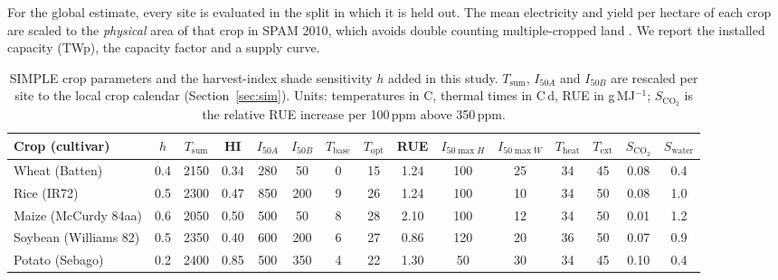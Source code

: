 For the global estimate, every site is evaluated in the split in which it is held out. The mean electricity and yield per hectare of each crop are scaled to the \emph{physical} area of that crop in SPAM 2010, which avoids double counting multiple-cropped land \citep{waha2020}. We report the installed capacity (TWp), the capacity factor and a supply curve.

\begin{table}[t]
\centering
\caption{SIMPLE crop parameters \citep[Table 1a]{zhao2019} and the harvest-index shade sensitivity $h$ added in this study. $T_{\mathrm{sum}}$, $I_{50A}$ and $I_{50B}$ are rescaled per site to the local crop calendar (Section~\ref{sec:sim}). Units: temperatures in \textdegree C, thermal times in \textdegree C\,d, RUE in g\,MJ$^{-1}$; $S_{\mathrm{CO_2}}$ is the relative RUE increase per 100\,ppm above 350\,ppm.}
\label{tab:params}
\scriptsize
\setlength{\tabcolsep}{3pt}
\begin{tabular}{lcccccccccccccc}
\toprule
Crop (cultivar) & $h$ & $T_{\mathrm{sum}}$ & HI & $I_{50A}$ & $I_{50B}$ & $T_{\mathrm{base}}$ & $T_{\mathrm{opt}}$ & RUE & $I_{50\max H}$ & $I_{50\max W}$ & $T_{\mathrm{heat}}$ & $T_{\mathrm{ext}}$ & $S_{\mathrm{CO_2}}$ & $S_{\mathrm{water}}$\\
\midrule
Wheat (Batten) & 0.4 & 2150 & 0.34 & 280 & 50 & 0 & 15 & 1.24 & 100 & 25 & 34 & 45 & 0.08 & 0.4\\
Rice (IR72) & 0.5 & 2300 & 0.47 & 850 & 200 & 9 & 26 & 1.24 & 100 & 10 & 34 & 50 & 0.08 & 1.0\\
Maize (McCurdy 84aa) & 0.6 & 2050 & 0.50 & 500 & 50 & 8 & 28 & 2.10 & 100 & 12 & 34 & 50 & 0.01 & 1.2\\
Soybean (Williams 82) & 0.5 & 2350 & 0.40 & 600 & 200 & 6 & 27 & 0.86 & 120 & 20 & 36 & 50 & 0.07 & 0.9\\
Potato (Sebago) & 0.2 & 2400 & 0.85 & 500 & 350 & 4 & 22 & 1.30 & 50 & 30 & 34 & 45 & 0.10 & 0.4\\
\bottomrule
\end{tabular}
\end{table}
